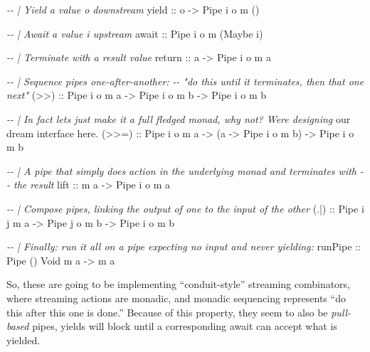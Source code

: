 \documentclass[]{article}
\newenvironment{Shaded}{}{}
\newcommand{\CommentTok}[1]{\textcolor[rgb]{0.38,0.63,0.69}{\textit{#1}}}
\newcommand{\DataTypeTok}[1]{\textcolor[rgb]{0.56,0.13,0.00}{#1}}
\newcommand{\FunctionTok}[1]{\textcolor[rgb]{0.02,0.16,0.49}{#1}}
\newcommand{\NormalTok}[1]{#1}
\newcommand{\OperatorTok}[1]{\textcolor[rgb]{0.40,0.40,0.40}{#1}}
\newcommand{\OtherTok}[1]{\textcolor[rgb]{0.00,0.44,0.13}{#1}}
\begin{document}
\begin{Shaded}
\begin{Highlighting}[]
\CommentTok{{-}{-} | Yield a value \textasciigrave{}o\textasciigrave{} downstream}
\OtherTok{yield ::}\NormalTok{ o }\OtherTok{{-}>} \DataTypeTok{Pipe}\NormalTok{ i o m ()}

\CommentTok{{-}{-} | Await a value \textasciigrave{}i\textasciigrave{} upstream}
\OtherTok{await ::} \DataTypeTok{Pipe}\NormalTok{ i o m (}\DataTypeTok{Maybe}\NormalTok{ i)}

\CommentTok{{-}{-} | Terminate with a result value}
\FunctionTok{return}\OtherTok{ ::}\NormalTok{ a }\OtherTok{{-}>} \DataTypeTok{Pipe}\NormalTok{ i o m a}

\CommentTok{{-}{-} | Sequence pipes one{-}after{-}another:}
\CommentTok{{-}{-} "do this until it terminates, then that one next"}
\OtherTok{(>>) ::} \DataTypeTok{Pipe}\NormalTok{ i o m a }\OtherTok{{-}>} \DataTypeTok{Pipe}\NormalTok{ i o m b }\OtherTok{{-}>} \DataTypeTok{Pipe}\NormalTok{ i o m b}

\CommentTok{{-}{-} | In fact let\textquotesingle{}s just make it a full fledged monad, why not?  We\textquotesingle{}re designing}
\NormalTok{our dream interface here}\OperatorTok{.}
\OtherTok{(>>=) ::} \DataTypeTok{Pipe}\NormalTok{ i o m a }\OtherTok{{-}>}\NormalTok{ (a }\OtherTok{{-}>} \DataTypeTok{Pipe}\NormalTok{ i o m b) }\OtherTok{{-}>} \DataTypeTok{Pipe}\NormalTok{ i o m b}

\CommentTok{{-}{-} | A pipe that simply does action in the underlying monad and terminates with}
\CommentTok{{-}{-} the result}
\OtherTok{lift ::}\NormalTok{ m a }\OtherTok{{-}>} \DataTypeTok{Pipe}\NormalTok{ i o m a}

\CommentTok{{-}{-} | Compose pipes, linking the output of one to the input of the other}
\OtherTok{(.|) ::} \DataTypeTok{Pipe}\NormalTok{ i j m a }\OtherTok{{-}>} \DataTypeTok{Pipe}\NormalTok{ j o m b }\OtherTok{{-}>} \DataTypeTok{Pipe}\NormalTok{ i o m b}

\CommentTok{{-}{-} | Finally: run it all on a pipe expecting no input and never yielding:}
\OtherTok{runPipe ::} \DataTypeTok{Pipe}\NormalTok{ () }\DataTypeTok{Void}\NormalTok{ m a }\OtherTok{{-}>}\NormalTok{ m a}
\end{Highlighting}
\end{Shaded}

So, these are going to be implementing ``conduit-style'' streaming combinators,
where streaming actions are monadic, and monadic sequencing represents ``do this
after this one is done.'' Because of this property, they seem to also be
\emph{pull-based} pipes, yields will block until a corresponding await can
accept what is yielded.
\end{document}
